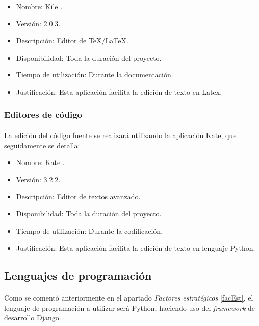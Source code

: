       \begin{itemize}
         \item Nombre: Kile \cite{kile}.
         \item Versión: 2.0.3.
         \item Descripción: Editor de TeX/LaTeX.
         \item Disponibilidad: Toda la duración del proyecto.
         \item Tiempo de utilización: Durante la documentación.
         \item Justificación: Esta aplicación facilita la edición de texto en
         Latex.
      \end{itemize}

      \subsubsection{Editores de código}

      \paragraph{}La edición del código fuente se realizará utilizando la
      aplicación Kate, que seguidamente se detalla:

      \begin{itemize}
         \item Nombre: Kate \cite{kate}.
         \item Versión: 3.2.2.
         \item Descripción: Editor de textos avanzado.
         \item Disponibilidad: Toda la duración del proyecto.
         \item Tiempo de utilización: Durante la codificación.
         \item Justificación: Esta aplicación facilita la edición de texto
               en lenguaje Python.
      \end{itemize}

   \subsection{Lenguajes de programación}

   \paragraph{}Como se comentó anteriormente en el apartado \textit{Factores
   estratégicos} \ref{facEst}, el lenguaje de programación a utilizar será
   Python, haciendo uso del \textit{framework} de desarrollo Django.

